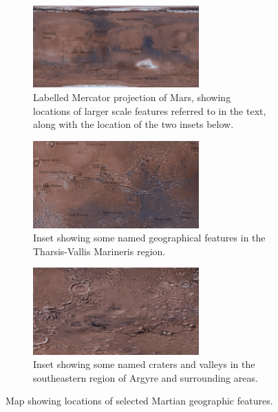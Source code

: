 \documentclass[12pt]{iopart}
\numberwithin{equation}{section}
\begin{document}
\begin{figure}
    \centering
    \begin{subfigure}[b]{\textwidth}
      \centering
        \includegraphics[width=0.7\textwidth]{Mars1WithNames.png}
        \caption{\small{Labelled Mercator projection of Mars, showing locations of larger scale features referred to in the text, along with the location of the two insets below.}}
        \label{fig:MarsMapBig}
    \end{subfigure}

    \begin{subfigure}[b]{\textwidth}
      \centering
      \includegraphics[width=0.7\textwidth]{MarsVallisWithNames.png}
      \caption{\small{Inset showing some named geographical features in the Tharsis-Vallis Marineris region.}}
      \label{fig:MarsMapVallis}
    \end{subfigure}

    \begin{subfigure}[b]{\textwidth}
      \centering
      \includegraphics[width=0.7\textwidth]{MarsSEArgyreWithNames.png}
      \caption{\small{Inset showing some named craters and valleys in the southeastern region of Argyre and surrounding areas.}}
      \label{fig:MarsMapArgyre}
    \end{subfigure}
    \caption{\small{Map showing locations of selected Martian geographic features.}}
    \label{fig:MarsMap}
\end{figure}
\end{document}
